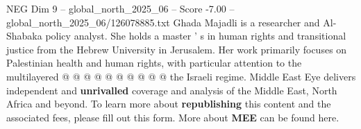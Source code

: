 \begin{textsample}{NEG Dim 9 – global\_north\_2025\_06 – Score -7.00 – global\_north\_2025\_06/126078885.txt}
Ghada Majadli is a researcher and Al-Shabaka policy analyst.
She holds a master ' s in human rights and transitional justice from the Hebrew University in Jerusalem.
Her work primarily focuses on Palestinian health and human rights, with particular attention to the multilayered @ @ @ @ @ @ @ @ @ @ the Israeli regime.
Middle East Eye delivers independent and \textbf{unrivalled} coverage and analysis of the Middle East, North Africa and beyond.
To learn more about \textbf{republishing} this content and the associated fees, please fill out this form.
More about \textbf{MEE} can be found here.

\end{textsample}
